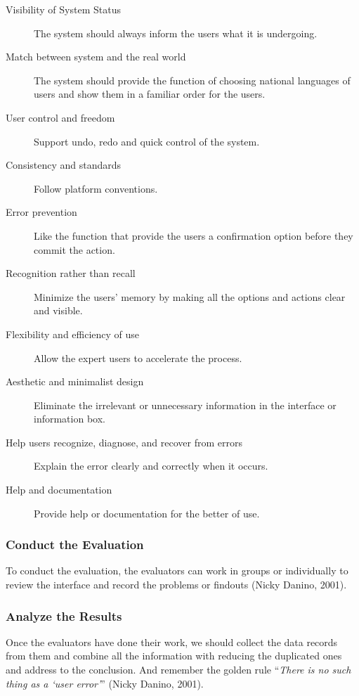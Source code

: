 \documentclass[twocolumn]{article}
\begin{document}
\begin{description}
  \item[Visibility of System Status]
    The system should always inform the users what it is undergoing.
  \item[Match between system and the real world]
    The system should provide the function of choosing national languages of users and show them in a familiar order for the users.
  \item[User control and freedom]
    Support undo, redo and quick control of the system.
  \item[Consistency and standards]
    Follow platform conventions.
  \item[Error prevention]
    Like the function that provide the users a confirmation option before they commit the action.
  \item[Recognition rather than recall]
    Minimize the users’ memory by making all the options and actions clear and visible.
  \item[Flexibility and efficiency of use]
    Allow the expert users to accelerate the process.
  \item[Aesthetic and minimalist design]
    Eliminate the irrelevant or unnecessary information in the interface or information box.
  \item[Help users recognize, diagnose, and recover from errors]
    Explain the error clearly and correctly when it occurs.
  \item[Help and documentation]
    Provide help or documentation for the better of use.
\end{description}

\subsubsection{Conduct the Evaluation}
To conduct the evaluation, the evaluators can work in groups or individually to review the interface and record the problems or findouts (Nicky Danino, 2001).

\subsubsection{Analyze the Results}
Once the evaluators have done their work, we should collect the data records from them and combine all the information with reducing the duplicated ones and address to the conclusion. And remember the golden rule “\emph{There is no such thing as a ‘user error’}” (Nicky Danino, 2001).
\end{document}
